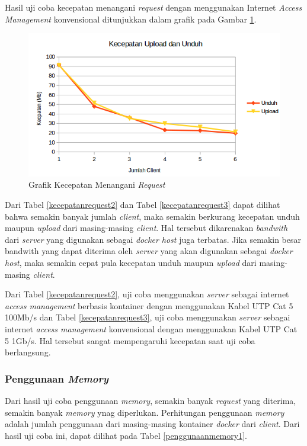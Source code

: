 Hasil uji coba kecepatan menangani \textit{request} dengan menggunakan Internet \textit{Access Management} konvensional ditunjukkan dalam grafik pada Gambar \ref{grafikkecepatan2}.

\begin{figure}[H]
	\centering
	\includegraphics[width=\linewidth]{images/bab5/kecepatan2}
	\caption{Grafik Kecepatan Menangani \textit{Request}}
	\label{grafikkecepatan2}
\end{figure}

Dari Tabel \ref{kecepatanrequest2} dan Tabel \ref{kecepatanrequest3} dapat dilihat bahwa semakin banyak jumlah \textit{client}, maka semakin berkurang kecepatan unduh maupun \textit{upload} dari masing-masing \textit{client}. Hal tersebut dikarenakan \textit{bandwith} dari \textit{server} yang digunakan sebagai \textit{docker host} juga terbatas. Jika semakin besar bandwith yang dapat diterima oleh \textit{server} yang akan digunakan sebagai \textit{docker host}, maka semakin cepat pula kecepatan unduh maupun \textit{upload} dari masing-masing \textit{client}. 

Dari Tabel \ref{kecepatanrequest2}, uji coba menggunakan \textit{server} sebagai internet \textit{access management} berbasis kontainer dengan menggunakan Kabel UTP Cat 5 100Mb/s dan Tabel \ref{kecepatanrequest3}, uji coba menggunakan \textit{server} sebagai internet \textit{access management} konvensional dengan menggunakan Kabel UTP Cat 5 1Gb/s. Hal tersebut sangat mempengaruhi kecepatan saat uji coba berlangsung.
 
\subsubsection{Penggunaan \textit{Memory}}
Dari hasil uji coba penggunaan \textit{memory}, semakin banyak \textit{request} yang diterima, semakin banyak \textit{memory} ynag diperlukan. Perhitungan penggunaan \textit{memory} adalah jumlah penggunaan dari masing-masing kontainer \textit{docker} dari \textit{client}. Dari hasil uji coba ini, dapat dilihat pada Tabel \ref{penggunaanmemory1}.

